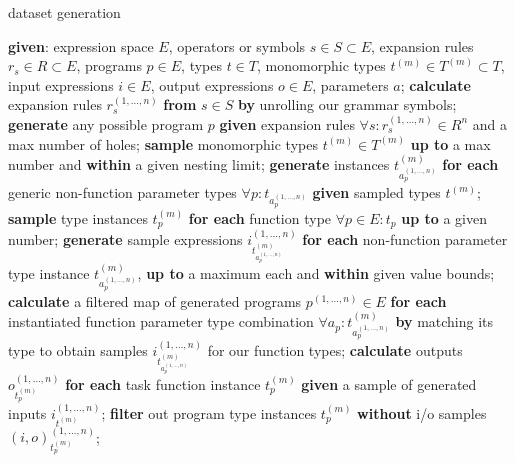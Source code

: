 \documentclass{article}
\begin{document}
\begin{algorithm}
    \caption{dataset generation}
    \label{alg:gen}
    \begin{algorithmic}
        \State \textbf{given}: expression space $E$, operators or symbols $s \in S \subset E$, expansion rules $r_s \in R \subset E$, programs $p \in E$, types $t \in T$, monomorphic types $t^{(m)} \in T^{(m)} \subset T$, input expressions $i \in E$, output expressions $o \in E$, parameters $a$;
        \State \textbf{calculate} expansion rules $r_s^{(1, \dots, n)}$ \textbf{from} $s \in S$ \textbf{by} unrolling our grammar symbols; %
        \State \textbf{generate} any possible program $p$ \textbf{given} expansion rules $\forall s : r_s^{(1, \dots, n)} \in R^n$ and a max number of holes;
        \State \textbf{sample} monomorphic types $t^{(m)} \in T^{(m)}$ \textbf{up to} a max number and \textbf{within} a given nesting limit;
        \State \textbf{generate} instances $t^{(m)}_{a_p^{(1, \dots, n)}}$ \textbf{for each} generic non-function parameter types $\forall p : t_{a_p^{(1, \dots, n)}}$ \textbf{given} sampled types $t^{(m)}$;
        \State \textbf{sample} type instances $t^{(m)}_p$ \textbf{for each} function type $\forall p \in E: t_p$ \textbf{up to} a given number;
        \State \textbf{generate} sample expressions $i_{t^{(m)}_{a_p^{(1, \dots, n)}}}^{(1, \dots, n)}$ \textbf{for each} non-function parameter type instance $t^{(m)}_{a_p^{(1, \dots, n)}}$, \textbf{up to} a maximum each and \textbf{within} given value bounds;
        \State \textbf{calculate} a filtered map of generated programs $p^{(1, \dots, n)} \in E$ \textbf{for each} instantiated function parameter type combination $\forall a_p : t^{(m)}_{a_p^{(1, \dots, n)}}$ \textbf{by} matching its type to obtain samples $i_{t^{(m)}_{a_p^{(1, \dots, n)}}}^{(1, \dots, n)}$ for our function types;
        \State \textbf{calculate} outputs $o_{t^{(m)}_p}^{(1, \dots, n)}$ \textbf{for each} task function instance $t^{(m)}_p$ \textbf{given} a sample of generated inputs $i_{t^{(m)}}^{(1, \dots, n)}$;
        \State \textbf{filter} out program type instances $t^{(m)}_p$ \textbf{without} i/o samples $(i,o)_{t^{(m)}_p}^{(1, \dots, n)}$;

\end{algorithmic}
\end{algorithm}
\end{document}
